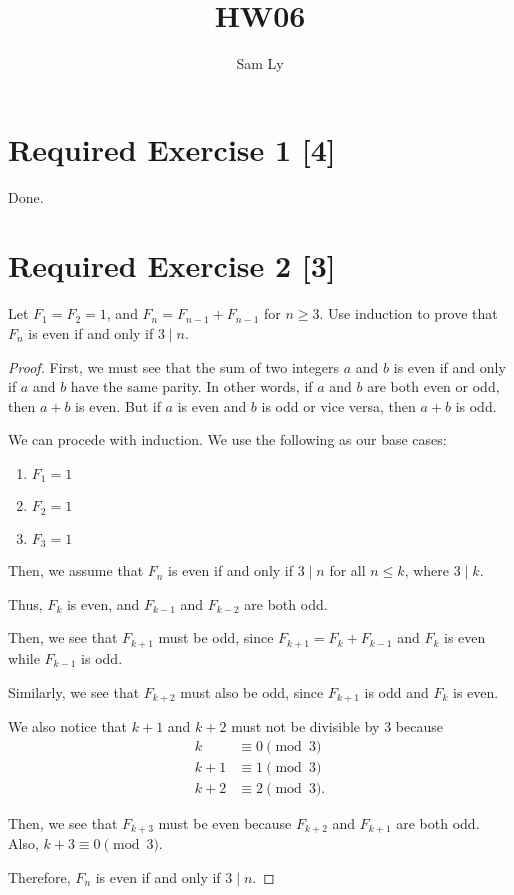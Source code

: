 \documentclass{article}
\title{HW06}
\author{Sam Ly}
\begin{document}
\maketitle

\section*{Required Exercise 1 [4]}

Done.

\section*{Required Exercise 2 [3]}

Let \(F_1 = F_2 = 1\), and \(F_n = F_{n-1} + F_{n-1}\) for \(n \ge 3\). Use 
induction to prove that \(F_n\) is even if and only if \(3 \mid n\).

\begin{proof}
    First, we must see that the sum of two integers \(a\) and \(b\) is even if 
    and only if \(a\) and \(b \) have the same parity. In other words, if \(a\) 
    and \(b\) are both even or odd, then \(a + b\) is even. But if \(a\) is even 
    and \(b\) is odd or vice versa, then \(a + b \) is odd. 

    We can procede with induction. We use the following as our base cases: 
    \begin{enumerate}
        \item \(F_1 = 1\)
        \item \(F_2 = 1\)
        \item \(F_3 = 1\)
    \end{enumerate}

    Then, we assume that \(F_n\) is even if and only if \(3 \mid n\) for all 
    \(n \le k\), where \(3 \mid k\).

    Thus, \(F_k\) is even, and \(F_{k-1}\) and \(F_{k-2}\) are both odd. 

    Then, we see that \(F_{k+1}\) must be odd, since \(F_{k+1} = F_k + F_{k-1}\) 
    and \(F_k\) is even while \(F_{k-1}\) is odd. 

    Similarly, we see that \(F_{k+2}\) must also be odd, since \(F_{k+1}\) is odd 
    and \(F_k\) is even. 

    We also notice that \(k+1\) and \(k+2\) must not be divisible by 3 because
    \begin{align*}
        k &\equiv 0 \pmod3 \\
        k + 1 &\equiv 1 \pmod3\\
        k + 2 &\equiv 2 \pmod3.
    \end{align*}

    Then, we see that \(F_{k+3}\) must be even because \(F_{k+2}\) and \(F_{k+1}\)
    are both odd. Also, \(k + 3 \equiv 0 \pmod3\).

    Therefore, \(F_n\) is even if and only if \(3 \mid n\). 
\end{proof}
\end{document}
